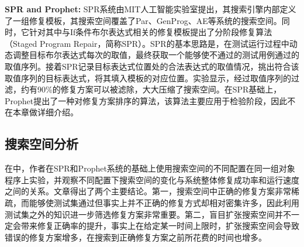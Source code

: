 \textbf{SPR and Prophet:}
SPR系统\cite{Long:2015:SPR:2786805.2786811}由MIT人工智能实验室提出，其搜索引擎内部定义了一组修复模板，其搜索空间覆盖了Par、GenProg、AE等系统的搜索空间。同时，它针对其中与If条件布尔表达式相关的修复模板提出了分阶段修复算法（Staged Program Repair，简称SPR）。SPR的基本思路是，在测试运行过程中动态调整目标布尔表达式每次的取值，最终获取一个能够使不通过的测试用例通过的取值序列。接着SPR记录目标表达式位置处的合法表达式的取值情况，挑出符合该取值序列的目标表达式，将其填入模板的对应位置。实验显示，经过取值序列的过滤，约有90\%的修复方案可以被滤除，大大压缩了搜索空间。在SPR基础上，Prophet\cite{long2016automatic}提出了一种对修复方案排序的算法，该算法主要应用于检验阶段，因此不在本章做详细介绍。
	


\subsection{搜索空间分析}

在\cite{spr_searchspace}中，作者在SPR和Prophet系统的基础上使用搜索空间的不同配置在同一组对象程序上实验，并观察不同配置下搜索空间的变化与系统整体修复成功率和运行速度之间的关系。文章得出了两个主要结论。第一，搜索空间中正确的修复方案非常稀疏，而能够使测试集通过但事实上并不正确的修复方式却相对密集许多，因此利用测试集之外的知识进一步筛选修复方案非常重要。第二，盲目扩张搜索空间并不一定会带来修复正确率的提升，事实上在给定某一时间上限时，扩张搜索空间会导致错误的修复方案增多，在搜索到正确修复方案之前所花费的时间也增多。



